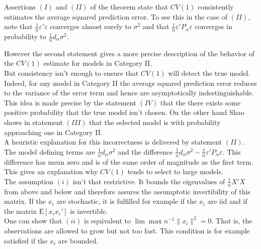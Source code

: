 \documentclass[Research_Module_ES.tex]{subfiles}
\begin{document}
Assertions $(I)$ and $(II)$ of the theorem state that $CV(1)$ consistently estimates the average squared prediction error. To see this in the case of $(II)$, note that $\frac{1}{n}\varepsilon'\varepsilon$ converges almost surely to $\sigma^2$ and that 
$\frac{1}{n}\varepsilon'P_\alpha\varepsilon$ converges in probability to $\frac{1}{n}d_\alpha\sigma^2$.\

However the second statement gives a more precise description of the behavior of the $CV(1)$ estimate for models in Category II. \\

But consistency isn't enough to ensure that $CV(1)$ will detect the true model. 
Indeed, for any model in Category II the average squared prediction error reduces to the variance of the error term and hence are asymptotically indestinguishable. 
This idea is made precise by the statement $(IV)$ that the there exists some positive probability that the true model isn't chosen. On the other hand Shao shows in statement $(III)$ that the selected model is with probability approaching one in Category II.\\

A heuristic explanation for this incorrectness is delivered by statement $(II)$. The model defining terms are $\frac{1}{n}d_\alpha\sigma^2$ and the difference $\frac{1}{n}d_\alpha\sigma^2 - \frac{1}{n}\varepsilon'P_\alpha\varepsilon$. This difference has mean zero and is of the same order of magnitude as the first term. This gives an explanation why $CV(1)$ tends to select to large models.\\

The assumption $(i)$ isn't that restrictive. It bounds the eigenvalues of $\frac{1}{n}X'X$ from above and below and therefore assures the assumptotic invertibility of this matrix. If the $x_i$ are stochastic, it is fulfilled for example if the $x_i$ are iid and if the matrix $\mathrm{E}[x_ix_i']$ is invertible.\\

One can show that $(ii)$ is equivalent to 
$\lim \max n^{-1}\lVert x_i\rVert^2=0$. That is, the observations are allowed to grow but not too fast. This condition is for example satisfied if the $x_i$ are bounded.
\end{document}
